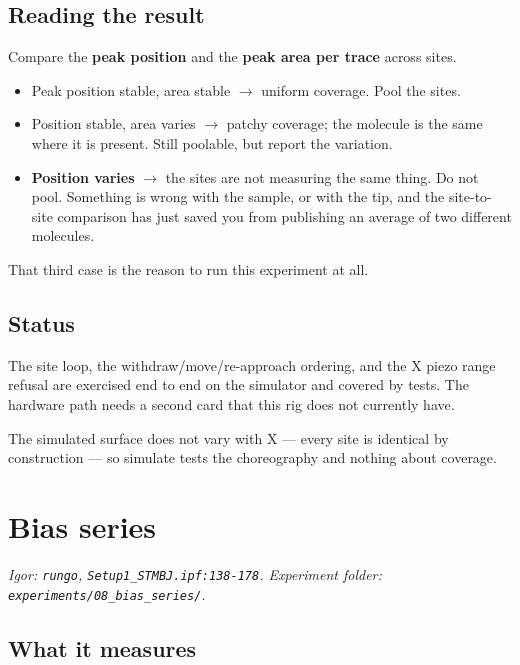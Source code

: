 \section{Reading the result}

Compare the \textbf{peak position} and the \textbf{peak area per trace} across sites.

\begin{itemize}[leftmargin=*]
\item Peak position stable, area stable $\rightarrow$ uniform coverage. Pool the sites.
\item Position stable, area varies $\rightarrow$ patchy coverage; the molecule is the same where it is present. Still poolable, but report the variation.
\item \textbf{Position varies} $\rightarrow$ the sites are not measuring the same thing. Do not pool. Something is wrong with the sample, or with the tip, and the site-to-site comparison has just saved you from publishing an average of two different molecules.
\end{itemize}

That third case is the reason to run this experiment at all.

\section{Status}

The site loop, the withdraw/move/re-approach ordering, and the X piezo range refusal are exercised end to end on the simulator and covered by tests. The hardware path needs a second card that this rig does not currently have.

The simulated surface does not vary with X --- every site is identical by construction --- so simulate tests the choreography and nothing about coverage.

\setcounter{chapter}{16}
\chapter{Bias series}

\emph{Igor: \texttt{rungo}, \texttt{Setup1\_\discretionary{}{}{}STMBJ.\discretionary{}{}{}ipf:138-178}. Experiment folder: \texttt{experiments/\discretionary{}{}{}08\_\discretionary{}{}{}bias\_\discretionary{}{}{}series/\discretionary{}{}{}}.}

\section{What it measures}

